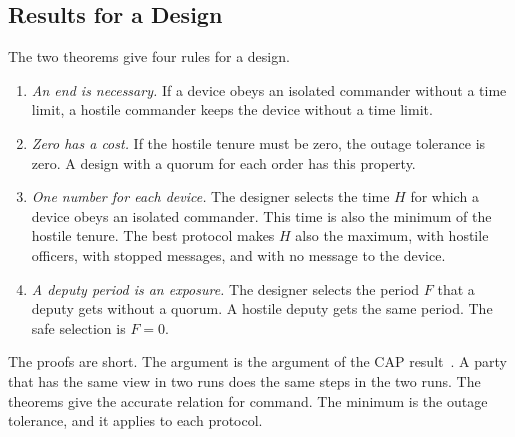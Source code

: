 \subsection{Results for a Design}
\label{sec:design}

The two theorems give four rules for a design.
\begin{enumerate}
  \item \emph{An end is necessary.} If a device obeys an isolated commander without a time
  limit, a hostile commander keeps the device without a time limit.
  \item \emph{Zero has a cost.} If the hostile tenure must be zero, the outage tolerance is
  zero. A design with a quorum for each order has this property.
  \item \emph{One number for each device.} The designer selects the time $H$ for which a
  device obeys an isolated commander. This time is also the minimum of the hostile tenure.
  The best protocol makes $H$ also the maximum, with hostile officers, with stopped
  messages, and with no message to the device.
  \item \emph{A deputy period is an exposure.} The designer selects the period $F$ that a
  deputy gets without a quorum. A hostile deputy gets the same period. The safe selection
  is $F = 0$.
\end{enumerate}

The proofs are short. The argument is the argument of the CAP
result~\cite{gilbert2002cap}. A party that has the same view in two runs does the same
steps in the two runs. The theorems give the accurate relation for command. The minimum is the outage tolerance, and it applies to each protocol.
